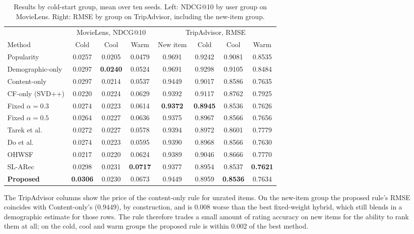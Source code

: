 \documentclass[runningheads]{llncs}
\begin{document}
\begin{table}[t]
  \caption{Results by cold-start group, mean over ten seeds. Left: NDCG@10 by user group on MovieLens. Right: RMSE by group on TripAdvisor, including the new-item group.}
  \label{tab:groups}
  \centering
  \small
  \setlength{\tabcolsep}{4pt}
  \begin{tabular}{l ccc cccc}
    \toprule
    & \multicolumn{3}{c}{MovieLens, NDCG@10} & \multicolumn{4}{c}{TripAdvisor, RMSE} \\
    \cmidrule(lr){2-4}\cmidrule(lr){5-8}
    Method & Cold & Cool & Warm & New item & Cold & Cool & Warm \\
    \midrule
    Popularity        & 0.0257 & 0.0205 & 0.0479 & 0.9691 & 0.9242 & 0.9081 & 0.8535 \\
    Demographic-only  & 0.0297 & \textbf{0.0240} & 0.0524 & 0.9691 & 0.9298 & 0.9105 & 0.8484 \\
    Content-only      & 0.0297 & 0.0214 & 0.0537 & 0.9449 & 0.9017 & 0.8586 & 0.7635 \\
    CF-only (SVD++)   & 0.0220 & 0.0224 & 0.0629 & 0.9392 & 0.9117 & 0.8762 & 0.7925 \\
    Fixed $\alpha=0.3$ & 0.0274 & 0.0223 & 0.0614 & \textbf{0.9372} & \textbf{0.8945} & 0.8536 & 0.7626 \\
    Fixed $\alpha=0.5$ & 0.0264 & 0.0227 & 0.0636 & 0.9375 & 0.8967 & 0.8566 & 0.7656 \\
    Tarek et al.      & 0.0272 & 0.0227 & 0.0578 & 0.9394 & 0.8972 & 0.8601 & 0.7779 \\
    Do et al.         & 0.0274 & 0.0223 & 0.0595 & 0.9390 & 0.8968 & 0.8566 & 0.7630 \\
    OHWSF             & 0.0217 & 0.0220 & 0.0624 & 0.9389 & 0.9046 & 0.8666 & 0.7770 \\
    SL-ARec           & 0.0298 & 0.0231 & \textbf{0.0717} & 0.9377 & 0.8954 & 0.8537 & \textbf{0.7621} \\
    \textbf{Proposed} & \textbf{0.0306} & 0.0230 & 0.0673 & 0.9449 & 0.8959 & \textbf{0.8536} & 0.7634 \\
    \bottomrule
  \end{tabular}
\end{table}

The TripAdvisor columns show the price of the content-only rule for unrated items. On the new-item group the proposed rule's RMSE coincides with Content-only's ($0.9449$), by construction, and is $0.008$ worse than the best fixed-weight hybrid, which still blends in a demographic estimate for those rows. The rule therefore trades a small amount of rating accuracy on new items for the ability to rank them at all; on the cold, cool and warm groups the proposed rule is within $0.002$ of the best method.
\end{document}
